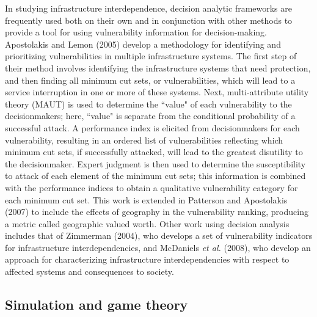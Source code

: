 In studying infrastructure interdependence, decision analytic frameworks are frequently used both on their own and in conjunction with other methods to provide a tool for using vulnerability information for decision-making.  Apostolakis and Lemon (2005)\cite{Apostolakis2005} develop a methodology for identifying and prioritizing vulnerabilities in multiple infrastructure systems.  The first step of their method involves identifying the infrastructure systems that need protection, and then finding all minimum cut sets, or vulnerabilities, which will lead to a service interruption in one or more of these systems.  Next, multi-attribute utility theory (MAUT) is used to determine the ``value" of each vulnerability to the decisionmakers; here, ``value" is separate from the conditional probability of a successful attack.  A performance index is elicited from decisionmakers for each vulnerability, resulting in an ordered list of vulnerabilities reflecting which minimum cut sets, if successfully attacked, will lead to the greatest disutility to the decisionmaker. Expert judgment is then used to determine the susceptibility to attack of each element of the minimum cut sets; this information is combined with the performance indices to obtain a qualitative vulnerability category for each minimum cut set.  This work is extended in Patterson and Apostolakis (2007)\cite{Patterson2007} to include the effects of geography in the vulnerability ranking, producing a metric called geographic valued worth.  Other work using decision analysis includes that of Zimmerman (2004)\cite{Zimmerman2004b}, who develops a set of vulnerability indicators for infrastructure interdependencies, and McDaniels \emph{et al.} (2008)\cite{McDaniels2008}, who develop an approach for characterizing infrastructure interdependencies with respect to affected systems and consequences to society.


\subsection{Simulation and game theory}
\label{sec:ch1:interdependentreliability:simulation}

